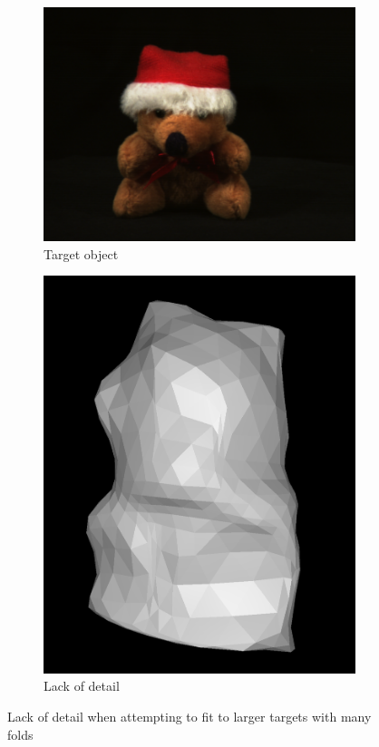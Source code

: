 \documentclass{article}
\begin{document}
\begin{figure}[h!]
  \centering
  \begin{subfigure}{0.45\textwidth}
    \centering
    \includegraphics[width=\textwidth]{images/teddy.png}
    \caption{Target object}
    \label{teddy}
  \end{subfigure}
  \hfill
  \begin{subfigure}{0.3\textwidth}
    \centering
    \includegraphics[width=\textwidth]{images/teddyfailure.png}
    \caption{Lack of detail}
    \label{teddyfailure}
  \end{subfigure}
  \caption{Lack of detail when attempting to fit to larger targets with many folds}
  \label{teddytarget}
\end{figure}
\end{document}
